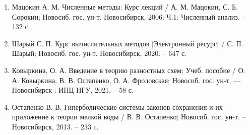 \documentclass[../main.tex]{subfile}
\begin{document}
\begin{enumerate}[nosep]
	\item Мацокин А. М. Численные методы: Курс лекций / А. М. Мацокин,
		С. Б. Сорокин; Новосиб. гос. ун-т. Новосибирск, 2006: Ч.1:
		Численный анализ. -- 132 с.
	\item Шарый С. П. Курс вычислительных методов [Электронный ресурс] /
		С. П. Шарый; Новосиб. гос. ун-т. Новосибирск, 2020. -- 647 с.
	\item Ковыркина, О. А. Введение в теорию разностных схем: Учеб. пособие
		/ О. А. Ковыркина, В. В. Остапенко, О. А. Фроловская; Новосиб.
		гос. ун-т. --- Новосибирск : ИПЦ НГУ, 2021. -- 58 с.
	\item Остапенко В. В. Гиперболические системы законов сохранения и их
		приложение к теории мелкой воды / В. В. Остапенко; Новосиб. гос.
		ун-т. -- Новосибирск, 2013. -- 233 c.
\end{enumerate}
\end{document}
